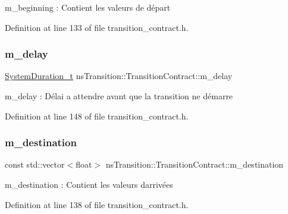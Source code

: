 m\+\_\+beginning \+: Contient les valeurs de départ 



Definition at line 133 of file transition\+\_\+contract.\+h.

\mbox{\label{classns_transition_1_1_transition_contract_a5c317b573104f3d3c9caafbc3014ac16}} 
\subsubsection{\texorpdfstring{m\+\_\+delay}{m\_delay}}
{\footnotesize\ttfamily \hyperlink{namespacens_transition_a260258f249f46ff9a62da721537f87af}{System\+Duration\+\_\+t} ns\+Transition\+::\+Transition\+Contract\+::m\+\_\+delay\hspace{0.3cm}{\ttfamily [protected]}}



m\+\_\+delay \+: Délai a attendre avant que la transition ne démarre 



Definition at line 148 of file transition\+\_\+contract.\+h.

\mbox{\label{classns_transition_1_1_transition_contract_adc660e53bde2e552bb4148ac7abc4e42}} 
\subsubsection{\texorpdfstring{m\+\_\+destination}{m\_destination}}
{\footnotesize\ttfamily const std\+::vector$<$float$>$ ns\+Transition\+::\+Transition\+Contract\+::m\+\_\+destination\hspace{0.3cm}{\ttfamily [protected]}}



m\+\_\+destination \+: Contient les valeurs d\textquotesingle{}arrivées 



Definition at line 138 of file transition\+\_\+contract.\+h.

